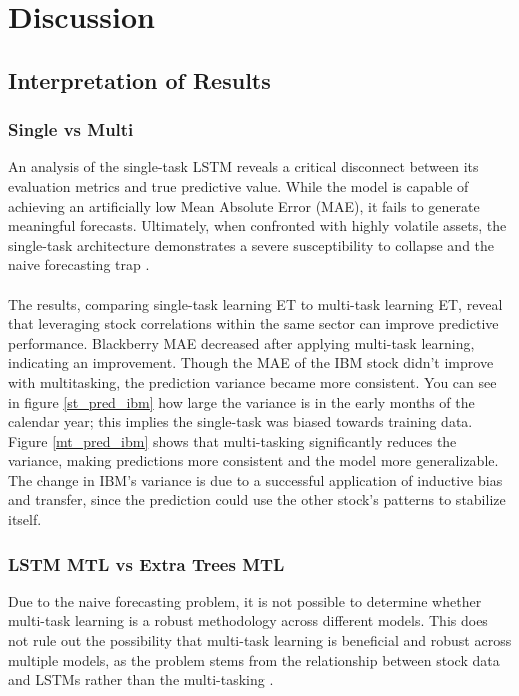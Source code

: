 \documentclass[conference]{IEEEtran}
\begin{document}
\section{Discussion}
\subsection{Interpretation of Results}
\subsubsection*{Single vs Multi}
An analysis of the single-task LSTM reveals a critical disconnect between its evaluation metrics and true predictive value. 
While the model is capable of achieving an artificially low Mean Absolute Error (MAE), it fails to generate meaningful forecasts. 
Ultimately, when confronted with highly volatile assets, the single-task architecture demonstrates a severe susceptibility to collapse
 and the naive forecasting trap \cite{naivethisdick}. \\  \\
The results, comparing single-task learning ET to multi-task learning ET, reveal that leveraging
stock correlations within the same sector can improve predictive performance. Blackberry MAE
decreased after applying multi-task learning, indicating an improvement. Though the MAE of the
IBM stock didn’t improve with multitasking, the prediction variance became more consistent.
You can see in figure \ref{st_pred_ibm} how large the variance is in the early months of the calendar
year; this implies the single-task was biased towards training data. Figure \ref{mt_pred_ibm} shows
that multi-tasking significantly reduces the variance, making predictions more consistent and the
model more generalizable. The change in IBM's variance is due to a successful application of
inductive bias and transfer, since the prediction could use the other stock’s patterns
to stabilize itself. 

\subsubsection*{LSTM MTL vs Extra Trees MTL}
Due to the naive forecasting problem, it is not possible to determine whether multi-task learning is
a robust methodology across different models. This does not rule out the possibility that multi-task
learning is beneficial and robust across multiple models, as the problem stems from the relationship
between stock data and LSTMs rather than the multi-tasking \cite{naivethisdick}. 
\end{document}
